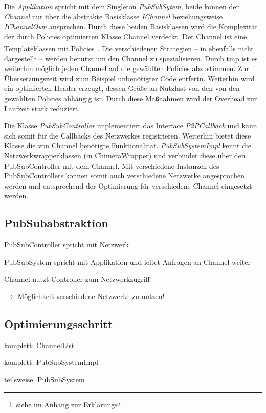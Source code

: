 Die \emph{Applikation} spricht mit dem Singleton \emph{PubSubSytem}, beide können den \emph{Channel} nur über die abstrakte Basisklasse \emph{IChannel} beziehungsweise \emph{IChannelOwn} ansprechen. Durch diese beiden Basisklassen wird die Komplexität der durch Policies optimierten Klasse Channel verdeckt. Der Channel ist eine Templateklassen mit Policies\footnote{siehe  im Anhang zur Erklärung}. Die verschiedenen Strategien -- in  ebenfalls nicht dargestellt -- werden benutzt um den Channel zu spezialisieren. Durch \ac{tmp} ist es weiterhin möglich jeden Channel auf die gewählten Policies abzustimmen. Zur Übersetzungszeit wird zum Beispiel unbenötigter Code entfertn. Weiterhin wird ein optimierten Header erzeugt, dessen Größe an Nutzlast von den von den gewählten Policies abhängig ist. Durch diese Maßnahmen wird der Overhead zur Laufzeit stark reduziert. 

Die Klasse \emph{PubSubController} implementiert das Interface \emph{P2PCallback} und kann sich somit für die Callbacks des Netzwerkes registrieren. Weiterhin bietet diese Klasse die von Channel benötigte Funktionalität. \emph{PubSubSystemImpl} kennt die Netzwerkwrapperklassen (in  ChimeraWrapper) und verbindet diese über den PubSubController mit dem Channel. Mit verschiedene Instanzen des PubSubControllers können somit auch verschiedene Netzwerke angesprochen werden und entsprechend der Optimierung für verschiedene Channel eingesetzt werden.


\subsection{PubSubabstraktion}
\begin{itemize*}
\item PubSubController spricht mit Netzwerk
\item PubSubSystem spricht mit Applikation und leitet Anfragen an Channel weiter
\item Channel nutzt Controller zum Netzwerkzugriff
\item $\rightarrow$ Möglichkeit verschiedene Netzwerke zu nutzen!
\end{itemize*}

\subsection{Optimierungsschritt}
\begin{itemize*}
\item komplett: ChannelList
\item komplett: PubSubSystemImpl
\item teilsweise: PubSubSystem
\end{itemize*}




